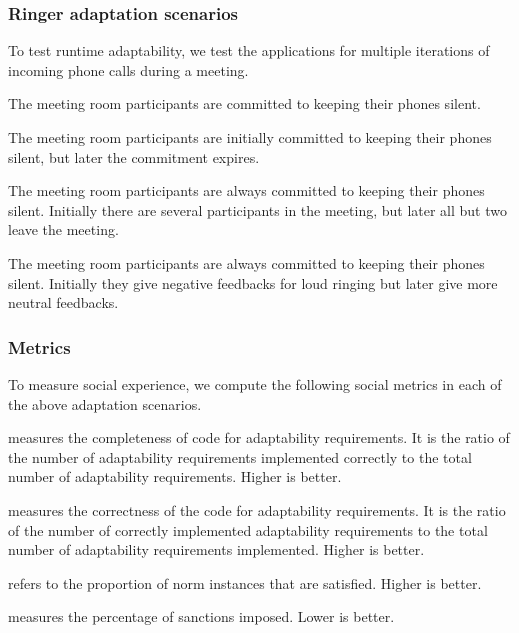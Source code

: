 \documentclass[11pt,          %
               phd,           %
               onehalfspacing %
               ]{ncsuthesis}
\begin{document}
\subsubsection*{Ringer adaptation scenarios}

To test runtime adaptability, we test the applications for
multiple iterations of incoming phone calls during a meeting.

\begin{description}[leftmargin=1em]
\item[Norms fixed.] 
The meeting room participants are committed to keeping their 
phones silent.

\item[Change in norms.] 
The meeting room participants are initially committed to keeping their
phones silent, but later the commitment expires. 

\item[Change in context.] 
The meeting room participants are always committed to keeping their
phones silent. Initially there are several participants in the meeting, but later
all but two leave the meeting.

\item[Change in sanction.] 
The meeting room participants are always committed to keeping their 
phones silent. Initially they give negative feedbacks for loud ringing
but later give more neutral feedbacks. 
\end{description}


\subsubsection*{Metrics}

To measure social experience, we compute the following social metrics
in each of the above adaptation scenarios. 
\begin{description}[leftmargin=1em] 
\item[Adaptability coverage] measures the completeness of code for
adaptability requirements. It is the ratio of the number of adaptability
requirements implemented correctly to the total number of adaptability
requirements. Higher is better.

\item[Adaptability correctness] measures the correctness of the code for
adaptability requirements. It is the ratio of the number of correctly 
implemented adaptability requirements to the total number of adaptability
requirements implemented. Higher is better.

\item[Norm compliance] refers to the proportion of norm instances that
are satisfied. Higher is better.

\item[Sanction proportion] measures the percentage of sanctions imposed.
Lower is better.
\end{description}
\end{document}
